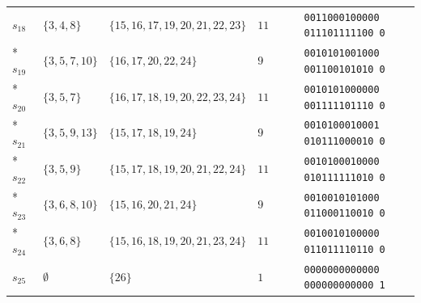 \documentclass[aps,pra,reprint,superscriptaddress,longbibliography,nofootinbib,floatfix,10pt]{revtex4-2}
\theoremstyle{definition}
\begin{document}
\begin{longtable}{llllc}
$s_{18}$ & $\{3,4,8\}$ & $\{15,16,17,19,20,21,22,23\}$ & $11$ & \texttt{0011000100000\,011101111100\,0} \\*
$s_{19}$ & $\{3,5,7,10\}$ & $\{16,17,20,22,24\}$ & $9$ & \texttt{0010101001000\,001100101010\,0} \\*
$s_{20}$ & $\{3,5,7\}$ & $\{16,17,18,19,20,22,23,24\}$ & $11$ & \texttt{0010101000000\,001111101110\,0} \\*
$s_{21}$ & $\{3,5,9,13\}$ & $\{15,17,18,19,24\}$ & $9$ & \texttt{0010100010001\,010111000010\,0} \\*
$s_{22}$ & $\{3,5,9\}$ & $\{15,17,18,19,20,21,22,24\}$ & $11$ & \texttt{0010100010000\,010111111010\,0} \\*
$s_{23}$ & $\{3,6,8,10\}$ & $\{15,16,20,21,24\}$ & $9$ & \texttt{0010010101000\,011000110010\,0} \\*
$s_{24}$ & $\{3,6,8\}$ & $\{15,16,18,19,20,21,23,24\}$ & $11$ & \texttt{0010010100000\,011011110110\,0} \\ \hline
$s_{25}$ & $\emptyset$ & $\{26\}$ & $1$ & \texttt{0000000000000\,000000000000\,1}
\end{longtable}
\endgroup
\end{document}
